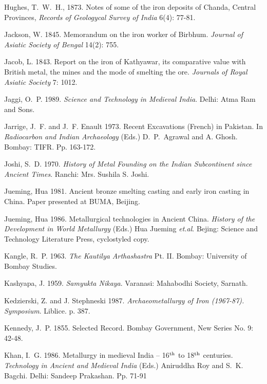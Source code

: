 \begin{thebibliography}{99}
 Hughes, T.~W.~H., 1873. Notes of some of the iron deposits of Chanda, Central Provinces, \textit{Records of Geologycal Survey of India} 6(4): 77-81.

 Jackson, W. 1845. Memorandum on the iron worker of Birbhum. \textit{Journal of Asiatic Society of Bengal} 14(2): 755.

 Jacob, L. 1843. Report on the iron of Kathyawar, its comparative value with British metal, the mines and the mode of smelting the ore. \textit{Journals of Royal Asiatic Society} 7: 1012.

 Jaggi, O.~P. 1989. \textit{Science and Technology in Medieval India}. Delhi: Atma Ram and Sons. 

 Jarrige, J.~F. and J.~F. Enault 1973. Recent Excavations (French) in Pakistan. In \textit{Radiocarbon and Indian Archaeology} (Eds.) D.~P.~Agrawal and A. Ghosh. Bombay: TIFR. Pp. 163-172.

 Joshi, S.~D. 1970. \textit{History of Metal Founding on the Indian Subcontinent since Ancient Times}. Ranchi: Mrs. Sushila S. Joshi.

 Jueming, Hua 1981. Ancient bronze smelting casting and early iron casting in China. Paper presented at BUMA, Beijing. 

 Jueming, Hua 1986. Metallurgical technologies in Ancient China. \textit{History of the Development in World Metallurgy} (Eds.) Hua Jueming \textit{et.al}. Bejing: Science and Technology Literature Press, cyclostyled copy.

 Kangle, R.~P. 1963. \textit{The Kautilya Arthashastra} Pt. II. Bombay: University of Bombay Studies.

 Kashyapa, J. 1959. \textit{Samyukta Nikaya}. Varanasi: Mahabodhi Society, Sarnath.

 Kedzierski, Z. and J. Stephneski 1987. \textit{Archaeometallurgy of Iron (1967-87). Symposium}. Liblice. p. 387.

 Kennedy, J.~P. 1855. Selected Record. Bombay Government, New Series No. 9: 42-48.

 Khan, I.~G. 1986. Metallurgy in medieval India – 16$^{\rm th}$ to 18$^{\rm th}$ centuries. \textit{Technology in Ancient and Medieval India} (Eds.) Aniruddha Roy and S.~K. Bagchi. Delhi: Sandeep Prakashan. Pp. 71-91 


\end{thebibliography}
